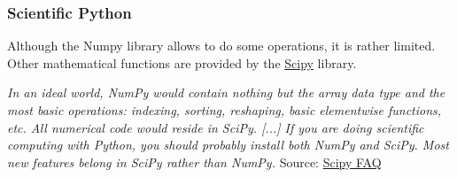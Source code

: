 \begin{frame}[fragile]
    \frametitle{Scientific Python}

    Although the Numpy library allows to do some operations, it is rather limited.
    Other mathematical functions are provided by the \href{https://www.scipy.org/}{Scipy} library. 

    \vspace{1em} 
    \emph{In an ideal world, NumPy would contain nothing but the array data type and the most basic operations: indexing, sorting, reshaping, basic elementwise functions, etc. All numerical code would reside in SciPy. [...] If you are doing scientific computing with Python, you should probably install both NumPy and SciPy. Most new features belong in SciPy rather than NumPy.} Source: \href{https://www.scipy.org/scipylib/faq.html#what-is-the-difference-between-numpy-and-scipy}{Scipy FAQ}

\end{frame}


